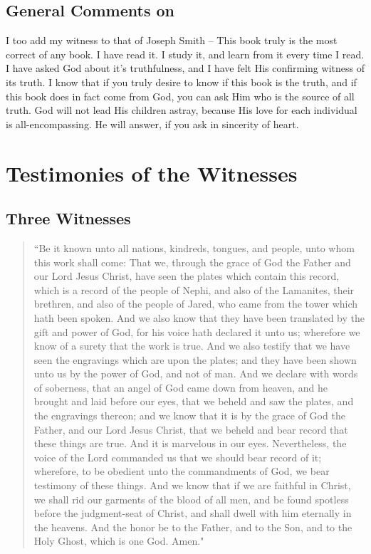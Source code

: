 \documentclass[12pt]{report}
\begin{document}
\section{General Comments on }
I too add my witness to that of Joseph Smith -- This book truly is the most correct of any book.  I have read it.  I study it, and learn from it every time I read.  I have asked God about it's truthfulness, and I have felt His confirming witness of its truth.  I know that if you truly desire to know if this book is the truth, and if this book does in fact come from God, you can ask Him who is the source of all truth.  God will not lead His children astray, because His love for each individual is all-encompassing.  He will answer, if you ask in sincerity of heart.

\chapter{Testimonies of the Witnesses\label{chapter:testimonies}}
\section{Three Witnesses\label{3witness}}
\begin{center}
\begin{quote}
``Be it known unto all nations, kindreds, tongues, and people, unto whom this work shall come: That we, through the grace of God the Father and our Lord Jesus Christ, have seen the plates which contain this record, which is a record of the people of Nephi, and also of the Lamanites, their brethren, and also of the people of Jared, who came from the tower which hath been spoken.  And we also know that they have been translated by the gift and power of God, for his voice hath declared it unto us; wherefore we know of a surety that the work is true.  And we also testify that we have seen the engravings which are upon the plates; and they have been shown unto us by the power of God, and not of man.  And we declare with words of soberness, that an angel of God came down from heaven, and he brought and laid before our eyes, that we beheld and saw the plates, and the engravings thereon; and we know that it is by the grace of God the Father, and our Lord Jesus Christ, that we beheld and bear record that these things are true.  And it is marvelous in our eyes.  Nevertheless, the voice of the Lord commanded us that we should bear record of it; wherefore, to be obedient unto the commandments of God, we bear testimony of these things. And we know that if we are faithful in Christ, we shall rid our garments of the blood of all men, and be found spotless before the judgment-seat of Christ, and shall dwell with him eternally in the heavens.  And the honor be to the Father, and to the Son, and to the Holy Ghost, which is one God.  Amen."
\end{quote}
\end{center}
\end{document}
